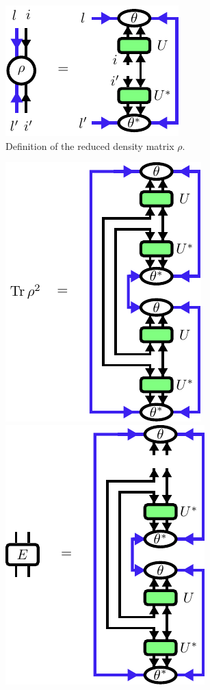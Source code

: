 \begin{figure}
	\centering
	\includegraphics[scale=1]{figures/tikz/disoTPS/rho_definition/rho_definition.pdf}
	\caption{Definition of the reduced density matrix $\rho$.}
	\label{fig:disentangling_rho_definition}
\end{figure}
\begin{figure}
	\centering
	\subcaptionbox{\label{fig:disentangling_evenbly_vidal_algorithm_trace_rho_squared}}
	{%
		\includegraphics[scale=1]{figures/tikz/disoTPS/evenbly_vidal_renyi_2/evenbly_vidal_renyi_2_a.pdf}
	}
	\quad\quad\quad\quad
	\subcaptionbox{\label{fig:disentangling_evenbly_vidal_algorithm_environment_definition}}
	{%
		\includegraphics[scale=1]{figures/tikz/disoTPS/evenbly_vidal_renyi_2/evenbly_vidal_renyi_2_b.pdf}
}
\end{figure}
